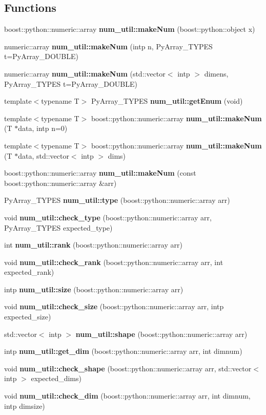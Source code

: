 \subsection*{Functions}
\begin{CompactItemize}
\item 
boost::python::numeric::array {\bf num\_\-util::make\-Num} (boost::python::object x)
\item 
numeric::array {\bf num\_\-util::make\-Num} (intp n, Py\-Array\_\-TYPES t=Py\-Array\_\-DOUBLE)
\item 
numeric::array {\bf num\_\-util::make\-Num} (std::vector$<$ intp $>$ dimens, Py\-Array\_\-TYPES t=Py\-Array\_\-DOUBLE)
\item 
template$<$typename T$>$ Py\-Array\_\-TYPES {\bf num\_\-util::get\-Enum} (void)
\item 
template$<$typename T$>$ boost::python::numeric::array {\bf num\_\-util::make\-Num} (T $\ast$data, intp n=0)
\item 
template$<$typename T$>$ boost::python::numeric::array {\bf num\_\-util::make\-Num} (T $\ast$data, std::vector$<$ intp $>$ dims)
\item 
boost::python::numeric::array {\bf num\_\-util::make\-Num} (const boost::python::numeric::array \&arr)
\item 
Py\-Array\_\-TYPES {\bf num\_\-util::type} (boost::python::numeric::array arr)
\item 
void {\bf num\_\-util::check\_\-type} (boost::python::numeric::array arr, Py\-Array\_\-TYPES expected\_\-type)
\item 
int {\bf num\_\-util::rank} (boost::python::numeric::array arr)
\item 
void {\bf num\_\-util::check\_\-rank} (boost::python::numeric::array arr, int expected\_\-rank)
\item 
intp {\bf num\_\-util::size} (boost::python::numeric::array arr)
\item 
void {\bf num\_\-util::check\_\-size} (boost::python::numeric::array arr, intp expected\_\-size)
\item 
std::vector$<$ intp $>$ {\bf num\_\-util::shape} (boost::python::numeric::array arr)
\item 
intp {\bf num\_\-util::get\_\-dim} (boost::python::numeric::array arr, int dimnum)
\item 
void {\bf num\_\-util::check\_\-shape} (boost::python::numeric::array arr, std::vector$<$ intp $>$ expected\_\-dims)
\item 
void {\bf num\_\-util::check\_\-dim} (boost::python::numeric::array arr, int dimnum, intp dimsize)

\end{CompactItemize}

